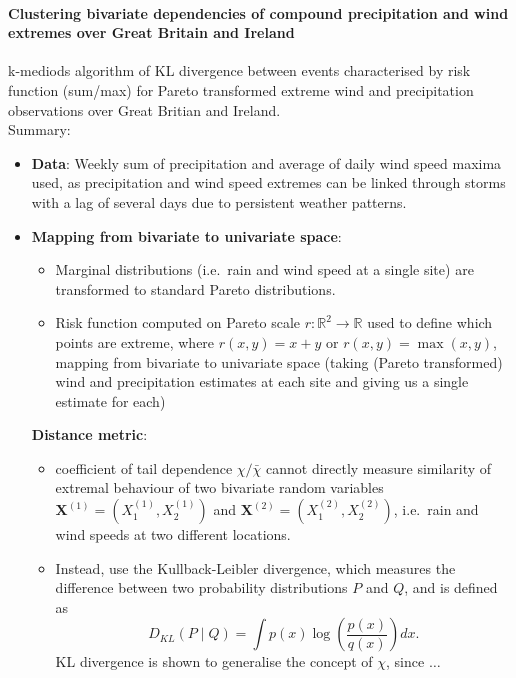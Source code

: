 \documentclass{article}
\numberwithin{equation}{section}
\begin{document}
\paragraph{Clustering bivariate dependencies of compound precipitation and wind extremes over Great Britain and Ireland}

\cite{Vignotto2021} k-mediods algorithm of KL divergence between events characterised by risk function (sum/max) for Pareto transformed extreme wind and precipitation observations over Great Britian and Ireland. \\ 
Summary:
\begin{itemize}
  \item \textbf{Data}: Weekly sum of precipitation and average of daily wind speed maxima used, as precipitation and wind speed extremes can be linked through storms with a lag of several days due to persistent weather patterns. 
  \item \textbf{Mapping from bivariate to univariate space}: 
  \begin{itemize}
    \item Marginal distributions (i.e.\ rain and wind speed at a single site) are transformed to standard Pareto distributions. 
    \item Risk function computed on Pareto scale $r:\mathbb{R}^2 \rightarrow \mathbb{R}$ used to define which points are extreme, where $r(x, y) = x + y$ or $r(x, y) = \max(x, y)$, mapping from bivariate to univariate space (taking (Pareto transformed) wind and precipitation estimates at each site and giving us a single estimate for each)   \end{itemize}
  \textbf{Distance metric}:
  \begin{itemize}
    \item coefficient of tail dependence $\chi/\bar{\chi}$ cannot directly measure similarity of extremal behaviour of two bivariate random variables $\bm{X}^{(1)} = (X_1^{(1)}, X_2^{(1)})$ and $\bm{X}^{(2)} = (X_1^{(2)}, X_2^{(2)})$, i.e.\ rain and wind speeds at two different locations.
    \item Instead, use the Kullback-Leibler divergence, which measures the difference between two probability distributions $P$ and $Q$, and is defined as 
    \[
      D_{KL}(P \mid Q) = \int{p(x) \log\left(\frac{p(x)}{q(x)}\right)dx}.
    \]
    KL divergence is shown to generalise the concept of $\chi$, since $\ldots$ 

\end{itemize}
\end{itemize}
\end{document}
